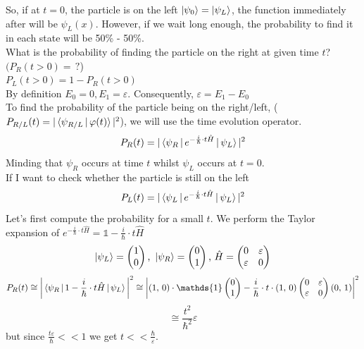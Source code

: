 \newline
So, if at $t=0$, the  particle is on the left $\ket{\psi_0}=\ket{\psi_L}$, the function immediately after will be $\psi_L(x)$. However, if we wait long enough, the probability to find it in each state will be 50\% - 50\%. \\
What is the probability of finding the particle on the right at given time $t$? \\
$(P_R(t>0)=\,?$)\\
$P_L(t>0)=1-P_R(t>0)$\\
By definition $E_0=0, E_1= \varepsilon$. Consequently, $\varepsilon = E_1-E_0$\\
To find the probability of the particle being on the right/left, ($P_{R/L}(t)=|\braket{\psi_{R/L}\,|\,\varphi(t)}|^2$), we will use the time evolution operator.\\
\[
P_R(t)=|\braket{\psi_R\,|\,e^{-\frac{i}{\hbar}\cdot t \hat{H}}\,|\,\psi_L}|^2
\]
Minding that $\psi_R$ occurs at time $t$ whilst $\psi_L$ occurs at $t=0$.\\
If I want to check whether the particle is still on the left
\[
P_L(t)=|\braket{\psi_L\,|\,e^{-\frac{i}{\hbar}\cdot t \hat{H}}\,|\,\psi_L}|^2
\]
Let's first compute the probability for a small $t$. We perform the Taylor expansion of $e^{-\frac{i}{\hbar}\cdot t \hat{H}} = \mathds{1} -\frac{i}{\hbar}\cdot t\hat{H}$
\[
\ket{\psi_L}=\begin{pmatrix}
1\\0
\end{pmatrix}
\text{, }
\ket{\psi_R}=
\begin{pmatrix}
0\\1
\end{pmatrix}
\text{, }
\hat{H}=
\begin{pmatrix}
0 & \varepsilon\\ \varepsilon & 0
\end{pmatrix}
\]
\[
P_R(t)\cong\bigg|\braket{\psi_R\,|\,1-\frac{i}{\hbar}\cdot t \hat{H}\,|\,\psi_L}\bigg|^2 \cong
\bigg|(1,\,0) \cdot \mathds{1}
\begin{pmatrix}
0\\1
\end{pmatrix}
-\frac{i}{\hbar}\cdot t \cdot (1,\,0)
\begin{pmatrix}
0 & \varepsilon\\ \varepsilon & 0
\end{pmatrix}
(0,\,1)\bigg|^2
\]
\[
\cong \frac{t^2}{\hbar^2}\varepsilon
\]
but since $\frac{t\varepsilon}{\hbar}<<1$ we get $t << \frac{\hbar}{\varepsilon}$.\\
